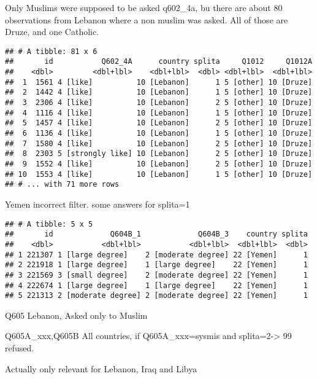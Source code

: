 \documentclass[]{article}
\begin{document}
Only Muslims were supposed to be asked q602\_4a, bu there are about 80
observations from Lebanon where a non muslim was asked. All of those are
Druze, and one Catholic.

\begin{verbatim}
## # A tibble: 81 x 6
##       id           Q602_4A      country splita     Q1012     Q1012A
##    <dbl>         <dbl+lbl>    <dbl+lbl>  <dbl> <dbl+lbl>  <dbl+lbl>
##  1  1561 4 [like]          10 [Lebanon]      1 5 [other] 10 [Druze]
##  2  1442 4 [like]          10 [Lebanon]      1 5 [other] 10 [Druze]
##  3  2306 4 [like]          10 [Lebanon]      2 5 [other] 10 [Druze]
##  4  1116 4 [like]          10 [Lebanon]      1 5 [other] 10 [Druze]
##  5  1457 4 [like]          10 [Lebanon]      2 5 [other] 10 [Druze]
##  6  1136 4 [like]          10 [Lebanon]      1 5 [other] 10 [Druze]
##  7  1580 4 [like]          10 [Lebanon]      2 5 [other] 10 [Druze]
##  8  2303 5 [strongly like] 10 [Lebanon]      2 5 [other] 10 [Druze]
##  9  1552 4 [like]          10 [Lebanon]      2 5 [other] 10 [Druze]
## 10  1553 4 [like]          10 [Lebanon]      1 5 [other] 10 [Druze]
## # ... with 71 more rows
\end{verbatim}

Yemen incorrect filter. some answers for splita=1

\begin{verbatim}
## # A tibble: 5 x 5
##       id             Q604B_1             Q604B_3    country splita
##    <dbl>           <dbl+lbl>           <dbl+lbl>  <dbl+lbl>  <dbl>
## 1 221307 1 [large degree]    2 [moderate degree] 22 [Yemen]      1
## 2 221918 1 [large degree]    1 [large degree]    22 [Yemen]      1
## 3 221569 3 [small degree]    2 [moderate degree] 22 [Yemen]      1
## 4 222674 1 [large degree]    1 [large degree]    22 [Yemen]      1
## 5 221313 2 [moderate degree] 2 [moderate degree] 22 [Yemen]      1
\end{verbatim}

Q605 Lebanon, Asked only to Muslim

Q605A\_xxx,Q605B All countries, if Q605A\_xxx=sysmis and
splita=2-\textgreater{} 99 refused.

Actually only relevant for Lebanon, Iraq and Libya
\end{document}
